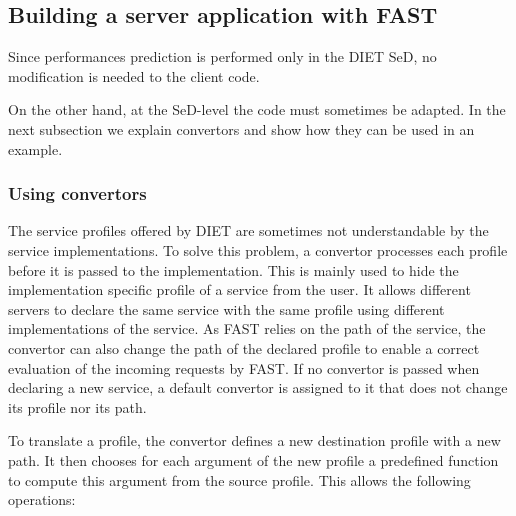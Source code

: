 \subsection{Building a server application with FAST}

Since performances prediction is performed only in the DIET SeD,
no modification is needed to the client code.

On the other hand, at the SeD-level the code must sometimes be adapted.  In
the next subsection we explain convertors and show how they can be used
in an example.

\subsubsection{Using convertors}

The service profiles offered by DIET are sometimes not
understandable by the service implementations. To solve this problem,
a convertor processes each profile before it is passed to the
implementation. This is mainly used to
hide the implementation specific profile of a service from
the user. It allows different servers to declare the same
service with the same profile using different implementations
of the service. As FAST relies on the path of the service, the
convertor can also change the path of the declared profile to
enable a correct evaluation of the incoming requests by FAST.
If no convertor is passed when declaring a new service, a
default convertor is assigned to it that does not change its
profile nor its path.

To translate a profile, the convertor defines a new
destination profile with a new path. It then chooses for
each argument of the new profile a predefined function
to compute this argument from the source profile. This
allows the following operations:


